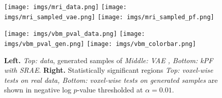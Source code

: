 \begin{figure}[b!]
    \centering
    \begin{minipage}{.63\linewidth}
      \centering
      \texttt{[image: imgs/mri\_data.png]}
      \texttt{[image: imgs/mri\_sampled\_vae.png]}
      \texttt{[image: imgs/mri\_sampled\_pf.png]}
    \end{minipage}%
    \begin{minipage}{0.25\linewidth}
        \centering
        \texttt{[image: imgs/vbm\_pval\_data.png]}
        \texttt{[image: imgs/vbm\_pval\_gen.png]}
        \texttt{[image: imgs/vbm\_colorbar.png]}
    \end{minipage}
    \vspace{-8pt}
    \caption{\footnotesize {\bf Left.} {\it Top: data}, generated samples of {\it Middle: VAE , Bottom: kPF with SRAE}.
    {\bf Right.} Statistically significant regions {\it Top: voxel-wise tests on real data, Bottom: voxel-wise tests on generated samples} are shown in negative log $p$-value thresholded at $\alpha=0.01$.}
    \label{fig: mr_gen}
    \vspace{-0.8em}
\end{figure}



